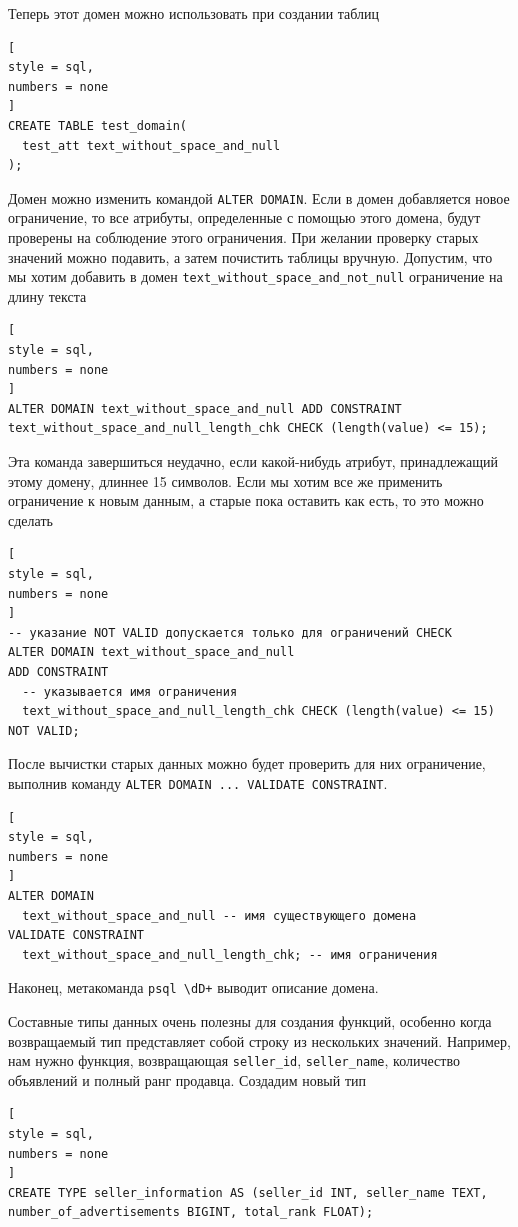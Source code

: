 \documentclass[%
	11pt,
	a4paper,
	utf8,
		]{article}
\begin{document}
Теперь этот домен можно использовать при создании таблиц
\begin{lstlisting}[
style = sql,
numbers = none
]
CREATE TABLE test_domain(
  test_att text_without_space_and_null
);
\end{lstlisting}

Домен можно изменить командой \texttt{ALTER DOMAIN}. Если в домен добавляется новое ограничение, то все атрибуты, определенные с помощью этого домена, будут проверены на соблюдение этого ограничения. При желании проверку старых значений можно подавить, а затем почистить таблицы вручную. Допустим, что мы хотим добавить в домен \verb|text_without_space_and_not_null| ограничение на длину текста
\begin{lstlisting}[
style = sql,
numbers = none
]
ALTER DOMAIN text_without_space_and_null ADD CONSTRAINT text_without_space_and_null_length_chk CHECK (length(value) <= 15);
\end{lstlisting}

Эта команда завершиться неудачно, если какой-нибудь атрибут, принадлежащий этому домену, длиннее 15 символов. Если мы хотим все же применить ограничение к новым данным, а старые пока оставить как есть, то это можно сделать
\begin{lstlisting}[
style = sql,
numbers = none
]
-- указание NOT VALID допускается только для ограничений CHECK
ALTER DOMAIN text_without_space_and_null
ADD CONSTRAINT
  -- указывается имя ограничения
  text_without_space_and_null_length_chk CHECK (length(value) <= 15) NOT VALID;
\end{lstlisting}

После вычистки старых данных можно будет проверить для них ограничение, выполнив команду \texttt{ALTER DOMAIN ... VALIDATE CONSTRAINT}.
\begin{lstlisting}[
style = sql,
numbers = none
]
ALTER DOMAIN
  text_without_space_and_null -- имя существующего домена
VALIDATE CONSTRAINT
  text_without_space_and_null_length_chk; -- имя ограничения
\end{lstlisting}

Наконец, метакоманда \verb|psql \dD+| выводит описание домена.

Составные типы данных очень полезны для создания функций, особенно когда возвращаемый тип представляет собой строку из нескольких значений. Например, нам нужно функция, возвращающая \verb|seller_id|, \verb|seller_name|, количество объявлений и полный ранг продавца. Создадим новый тип
\begin{lstlisting}[
style = sql,
numbers = none
]
CREATE TYPE seller_information AS (seller_id INT, seller_name TEXT, number_of_advertisements BIGINT, total_rank FLOAT);
\end{lstlisting}
\end{document}
